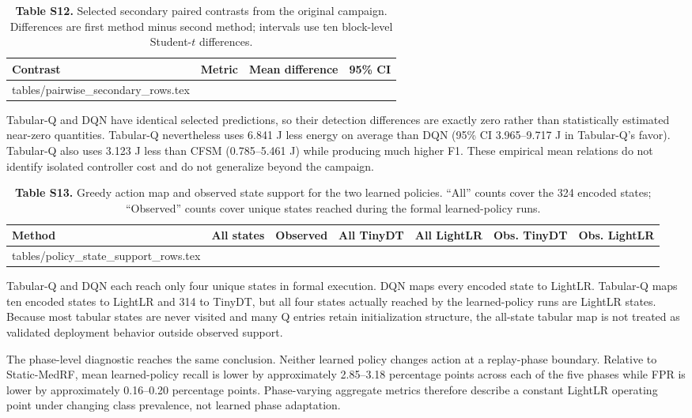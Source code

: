 \documentclass[10pt,a4paper]{article}
\makeatletter
\newcommand{\tableinput}[1]{\@@input #1.tex }
\makeatother
\begin{document}
\begin{table}[h!]
\centering\small
\caption*{\textbf{Table S12.} Selected secondary paired contrasts from the original campaign. Differences are first method minus second method; intervals use ten block-level Student-$t$ differences.}
\begin{tabular}{llrr}\toprule
Contrast & Metric & Mean difference & 95\% CI\\\midrule
\tableinput{tables/pairwise_secondary_rows}
\bottomrule\end{tabular}
\end{table}

Tabular-Q and DQN have identical selected predictions, so their detection differences are exactly zero rather than statistically estimated near-zero quantities. Tabular-Q nevertheless uses 6.841 J less energy on average than DQN (95\% CI 3.965--9.717 J in Tabular-Q's favor). Tabular-Q also uses 3.123 J less than CFSM (0.785--5.461 J) while producing much higher F1. These empirical mean relations do not identify isolated controller cost and do not generalize beyond the campaign.

\begin{table}[h!]
\centering\small
\caption*{\textbf{Table S13.} Greedy action map and observed state support for the two learned policies. ``All'' counts cover the 324 encoded states; ``Observed'' counts cover unique states reached during the formal learned-policy runs.}
\begin{tabular}{lrrrrrr}\toprule
Method & All states & Observed & All TinyDT & All LightLR & Obs. TinyDT & Obs. LightLR\\\midrule
\tableinput{tables/policy_state_support_rows}
\bottomrule\end{tabular}
\end{table}

Tabular-Q and DQN each reach only four unique states in formal execution. DQN maps every encoded state to LightLR. Tabular-Q maps ten encoded states to LightLR and 314 to TinyDT, but all four states actually reached by the learned-policy runs are LightLR states. Because most tabular states are never visited and many Q entries retain initialization structure, the all-state tabular map is not treated as validated deployment behavior outside observed support.

The phase-level diagnostic reaches the same conclusion. Neither learned policy changes action at a replay-phase boundary. Relative to Static-MedRF, mean learned-policy recall is lower by approximately 2.85--3.18 percentage points across each of the five phases while FPR is lower by approximately 0.16--0.20 percentage points. Phase-varying aggregate metrics therefore describe a constant LightLR operating point under changing class prevalence, not learned phase adaptation.
\end{document}
